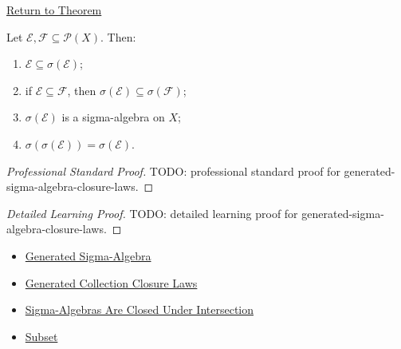 \newpage
{}
\label{prf:generated-sigma-algebra-closure-laws}

\begin{remark*}[Return]
\hyperref[thm:generated-sigma-algebra-closure-laws]{Return to Theorem}
\end{remark*}

\begin{theorem*}
Let \(\mathcal E,\mathcal F\subseteq\mathcal P(X)\).  Then:
\begin{enumerate}[label=(\roman*)]
\item \(\mathcal E\subseteq\sigma(\mathcal E)\);
\item if \(\mathcal E\subseteq\mathcal F\), then
      \(\sigma(\mathcal E)\subseteq\sigma(\mathcal F)\);
\item \(\sigma(\mathcal E)\) is a sigma-algebra on \(X\);
\item \(\sigma(\sigma(\mathcal E))=\sigma(\mathcal E)\).
\end{enumerate}
\end{theorem*}

\begin{proof}[Professional Standard Proof]
\LRAProofBodyStart
TODO: professional standard proof for generated-sigma-algebra-closure-laws.
\end{proof}

\begin{proof}[Detailed Learning Proof]
\LRAProofBodyStart
TODO: detailed learning proof for generated-sigma-algebra-closure-laws.
\end{proof}

\begin{remark*}
\end{remark*}

\begin{dependencies}
\begin{itemize}
  \item \hyperref[def:generated-sigma-algebra]{Generated Sigma-Algebra}
  \item \hyperref[thm:generated-collection-closure-laws]{Generated Collection Closure Laws}
  \item \hyperref[thm:sigma-algebras-closed-under-intersection]{Sigma-Algebras Are Closed Under Intersection}
  \item \hyperref[def:subset]{Subset}
\end{itemize}
\end{dependencies}

\clearpage
